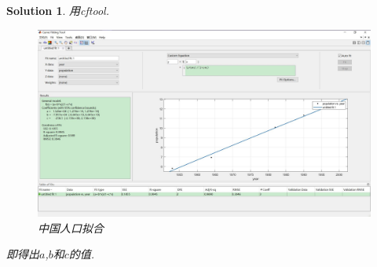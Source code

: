 \documentclass[a4paper, 12pt]{ctexart}
\theoremstyle{plain}
\theoremstyle{plain}
\theoremstyle{plain}
\theoremstyle{nonumberplain}
\newtheorem{solution}{Solution}
\begin{document}
    \begin{solution}
        用cftool.
        \begin{figure}[H]
            \centering
            \includegraphics[scale=0.32]{population.jpg}
            \caption{中国人口拟合}
        \end{figure}
        即得出$a$,$b$和$c$的值.
    \end{solution}


\end{document}
